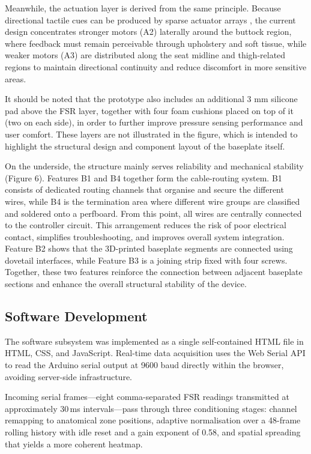 \documentclass[11pt, a4paper]{article}
\begin{document}
Meanwhile, the actuation layer is derived from the same principle. Because directional tactile cues can be produced by sparse actuator arrays \cite{Odesola2024SmartChairs, Israr2011TactileBrush, Dong2023DirectionalCues}, the current design concentrates stronger motors (A2) laterally around the buttock region, where feedback must remain perceivable through upholstery and soft tissue, while weaker motors (A3) are distributed along the seat midline and thigh-related regions to maintain directional continuity and reduce discomfort in more sensitive areas.

It should be noted that the prototype also includes an additional 3 mm silicone pad above the FSR layer, together with four foam cushions placed on top of it (two on each side), in order to further improve pressure sensing performance and user comfort. These layers are not illustrated in the figure, which is intended to highlight the structural design and component layout of the baseplate itself.



On the underside, the structure mainly serves reliability and mechanical stability (Figure 6). Features B1 and B4 together form the cable-routing system. B1 consists of dedicated routing channels that organise and secure the different wires, while B4 is the termination area where different wire groups are classified and soldered onto a perfboard. From this point, all wires are centrally connected to the controller circuit. This arrangement reduces the risk of poor electrical contact, simplifies troubleshooting, and improves overall system integration. Feature B2 shows that the 3D-printed baseplate segments are connected using dovetail interfaces, while Feature B3 is a joining strip fixed with four screws. Together, these two features reinforce the connection between adjacent baseplate sections and enhance the overall structural stability of the device.


\subsection{Software Development}

The software subsystem was implemented as a single self-contained HTML file in HTML, CSS, and JavaScript. Real-time data acquisition uses the Web Serial API to read the Arduino serial output at 9600 baud directly within the browser, avoiding server-side infrastructure.

Incoming serial frames---eight comma-separated FSR readings transmitted at approximately 30\,ms intervals---pass through three conditioning stages: channel remapping to anatomical zone positions, adaptive normalisation over a 48-frame rolling history with idle reset and a gain exponent of 0.58, and spatial spreading that yields a more coherent heatmap.
\end{document}
